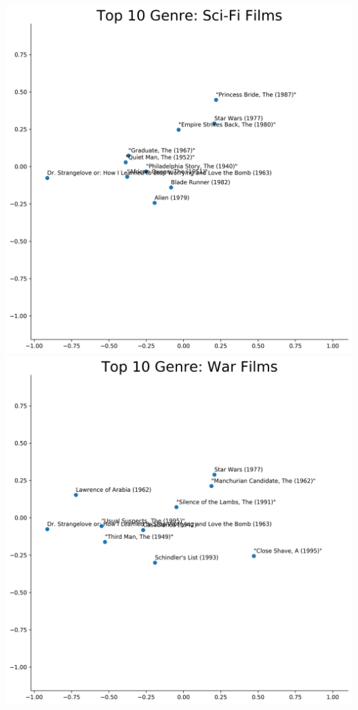 \includegraphics[scale=0.35]{"Top 10 Genre: Sci-Fi Films"}
\includegraphics[scale=0.35]{"Top 10 Genre: War Films"} \\ \\

